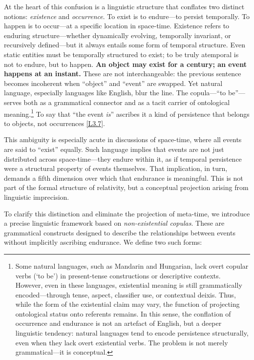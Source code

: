 \documentclass[12pt]{book}
\newcounter{logicanchor}
\newenvironment{logicanchorenv}[1]{\refstepcounter{logicanchor}\label{#1}}{}
\newcommand{\logiclink}[2]{\begin{logicanchorenv}{logic:#1}\end{logicanchorenv}\hyperref[appendix:#1]{[#1]}\xspace}
\begin{document}
At the heart of this confusion is a linguistic structure that conflates two distinct notions: \textit{existence} and \textit{occurrence}. To exist is to endure---to persist temporally. To happen is to occur---at a specific location in space-time. Existence refers to enduring structure---whether dynamically evolving, temporally invariant, or recursively defined---but it always entails some form of temporal structure. Even static entities must be temporally structured to exist; to be truly atemporal is not to endure, but to happen. \textbf{An object may exist for a century; an event happens at an instant.} These are not interchangeable: the previous sentence becomes incoherent when ``object'' and ``event'' are swapped. Yet natural language, especially languages like English, blur the line. The copula---``to be''---serves both as a grammatical connector and as a tacit carrier of ontological meaning.\footnote{Some natural languages, such as Mandarin and Hungarian, lack overt copular verbs (`to be') in present-tense constructions or descriptive contexts. However, even in these languages, existential meaning is still grammatically encoded---through tense, aspect, classifier use, or contextual deixis. Thus, while the form of the existential claim may vary, the function of projecting ontological status onto referents remains. In this sense, the conflation of occurrence and endurance is not an artefact of English, but a deeper linguistic tendency: natural languages tend to encode persistence structurally, even when they lack overt existential verbs. The problem is not merely grammatical---it is conceptual.} To say that ``the event \textit{is}'' ascribes it a kind of persistence that belongs to objects, not occurrences \logiclink{L3.7}{}.

This ambiguity is especially acute in discussions of space-time, where all events are said to ``exist'' equally. Such language implies that events are not just distributed across space-time---they endure within it, as if temporal persistence were a structural property of events themselves. That implication, in turn, demands a fifth dimension over which that endurance is meaningful. This is not part of the formal structure of relativity, but a conceptual projection arising from linguistic imprecision.

To clarify this distinction and eliminate the projection of meta-time, we introduce a precise linguistic framework based on \textit{non-existential copulas}. These are grammatical constructs designed to describe the relationships between events without implicitly ascribing endurance. We define two such forms:
\end{document}
